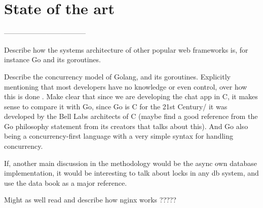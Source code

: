 \section{State of the art}

-----------------------------------

Describe how the systems architecture of other popular web frameworks is, for instance Go and its goroutines.

Describe the concurrency model of Golang, and its goroutines. Explicitly mentioning that most developers have no knowledge or even control, over how this is done \cite{Cox-Buday2017}. Make clear that since we are developing the chat app in C, it makes sense to compare it with Go, since Go is C for the 21st Century/ it was developed by the Bell Labs architects of C (maybe find a good reference from the Go philosophy statement from its creators that talks about this). And Go also being a concurrency-first language with a very simple syntax for handling concurrency.

If, another main discussion in the methodology would be the async own database implementation, it would be interesting to talk about locks in any db system, and use the data book as a major reference.

Might as well read and describe how nginx works ?????

